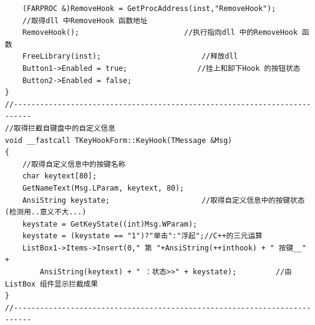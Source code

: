 \documentclass{suse-cs-thesis}
\begin{document}
\begin{verbatim}
    (FARPROC &)RemoveHook = GetProcAddress(inst,"RemoveHook");
    //取得dll 中RemoveHook 函数地址
    RemoveHook();                        //执行指向dll 中的RemoveHook 函数
    FreeLibrary(inst);                       //释放dll
    Button1->Enabled = true;                //挂上和卸下Hook 的按钮状态
    Button2->Enabled = false;
}
//--------------------------------------------------------------------------
//取得拦截自键盘中的自定义信息
void __fastcall TKeyHookForm::KeyHook(TMessage &Msg)
{
    //取得自定义信息中的按键名称
    char keytext[80];
    GetNameText(Msg.LParam, keytext, 80);
    AnsiString keystate;                     //取得自定义信息中的按键状态(检测用..意义不大...)
    keystate = GetKeyState((int)Msg.WParam);
    keystate = (keystate == "1")?"单击":"浮起";//C++的三元运算
    ListBox1->Items->Insert(0," 第 "+AnsiString(++inthook) + " 按键__" +
        AnsiString(keytext) + " ：状态>>" + keystate);         //由ListBox 组件显示拦截成果
}
//--------------------------------------------------------------------------
\end{verbatim}
\end{document}
